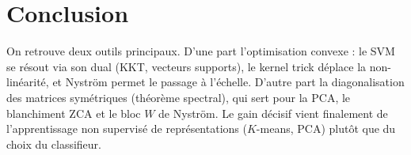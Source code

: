 \documentclass[11pt]{article}
\theoremstyle{remark}
\begin{document}
\section{Conclusion}
On retrouve deux outils principaux. D'une part l'optimisation convexe : le SVM se
résout via son dual (KKT, vecteurs supports), le kernel trick déplace la
non-linéarité, et Nyström permet le passage à l'échelle. D'autre part la
diagonalisation des matrices symétriques (théorème spectral), qui sert pour la PCA,
le blanchiment ZCA et le bloc $W$ de Nyström. Le gain décisif vient finalement de
l'apprentissage non supervisé de représentations ($K$-means, PCA) plutôt que du
choix du classifieur.
\end{document}
